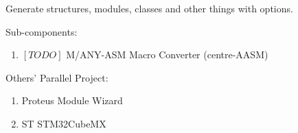 
Generate structures, modules, classes and other things with options.

Sub-components: 
\begin{enumerate}
	\item $[TODO]$ M/ANY-ASM Macro Converter (centre-AASM)
\end{enumerate}

Others' Parallel Project: 
\begin{enumerate}
	\item Proteus Module Wizard
	\item ST STM32CubeMX
\end{enumerate}
